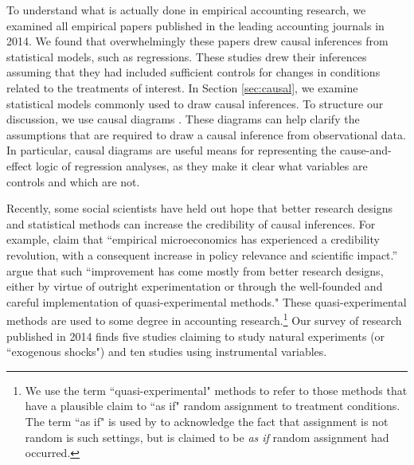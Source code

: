 \documentclass[11pt,reqno,titlepage]{amsart}
\begin{document}
\begin{doublespace}
To understand what is actually done in empirical accounting research, we examined all empirical papers published in the leading accounting journals in 2014. 
We found that overwhelmingly these papers drew causal inferences from statistical models, such as regressions. 
These studies drew their inferences assuming that they had included sufficient controls for changes in conditions related to the treatments of interest.
In Section \ref{sec:causal}, we examine statistical models commonly used to draw causal inferences.
To structure our discussion, we use causal diagrams \citep[advocated by, among others,][]{Pearl:2009kh}.
These diagrams can help clarify the assumptions that are required to draw a causal inference from observational data.
In particular, causal diagrams are useful means for representing the cause-and-effect logic of regression analyses, as they make it clear what variables are controls and which are not.

Recently, some social scientists have held out hope that better research designs and statistical methods can increase the credibility of causal inferences.
For example, \citet{Angrist:2010jv} claim that ``empirical microeconomics has experienced a credibility revolution, with a consequent increase in policy relevance and scientific impact.''  
\citet[p. 26]{Angrist:2010jv} argue that such ``improvement has come mostly from better research designs, either by virtue of outright experimentation or through the well-founded and careful implementation of quasi-experimental methods."
These quasi-experimental methods are used to some degree in accounting research.\footnote{
We use the term ``quasi-experimental" methods to refer to those methods that have a plausible claim to ``as if" random assignment to treatment conditions.
The term ``as if" is used by \citet{Dunning:2012tt} to acknowledge the fact that assignment is not random is such settings, but is claimed to be \emph{as if} random assignment had occurred.}
Our survey of research published in 2014 finds five studies claiming to study natural experiments (or ``exogenous shocks") and ten studies using instrumental variables.


\end{doublespace}
\end{document}
